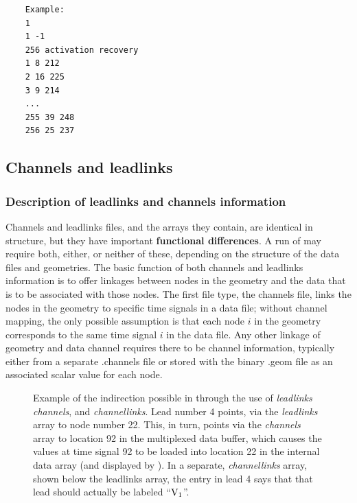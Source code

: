 \begin{verbatim}
    Example:
    1
    1 -1
    256 activation recovery
    1 8 212
    2 16 225
    3 9 214
    ...
    255 39 248
    256 25 237  
\end{verbatim}



\subsection{Channels and leadlinks}
\label{sec:leadfiles} 

\subsubsection{Description of leadlinks and channels
information}

Channels and leadlinks files, and the arrays they
contain, are identical in structure, but they have important {\bf
functional differences}.  A run of \map{} may require both, either, or
neither of these, depending on the structure of the data files and
geometries. The basic function of both channels and leadlinks information
is to offer linkages between nodes in the geometry and the data that is to
be associated with those nodes.  The first file type, the channels file,
links the nodes in the geometry to specific time signals in a data file;
without channel mapping, the only possible assumption is that each node $i$
in the geometry corresponds to the same time signal $i$ in the data file.
Any other linkage of geometry and data channel requires there to be channel
information, typically either from a separate .channels file or stored with
the binary .geom file as an associated scalar value for each node.

\begin{figure}[htb]
   \begin{makeimage}
    \end{makeimage}
    \indirec
    \caption{\label{fig:indirec}Example of the indirection possible in
      \map{} through the use of {\em leadlinks\/} {\em channels}, and {\em
        channellinks}.  Lead number 4 points, via the {\em leadlinks\/}
      array to node number 22.  This, in turn, points via the {\em
        channels\/} array to location 92 in the multiplexed data buffer,
      which causes the values at time signal 92 to be loaded into location
      22 in the internal data array (and displayed by \map{}).  In a
      separate, \emph{channellinks} array, shown below the leadlinks array,
      the entry in lead 4 says that that lead should actually be labeled
      ``${\rm V_{1}}$''. }
\end{figure}

